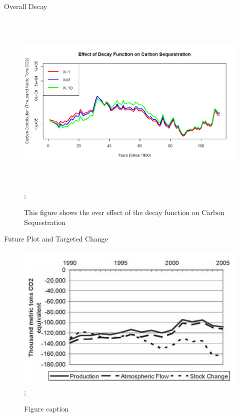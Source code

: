 \documentclass[final]{beamer}\usepackage[]{graphicx}\usepackage[]{color}
\newlength{\onecolwid}
\begin{document}
\begin{frame}[t]
\begin{columns}[t]
\begin{column}{\onecolwid}
\begin{block}{Overall Decay}
\begin{center}
\begin{figure}
    {\includegraphics[width=1\linewidth, height=9cm]{overalldecay.png}};
    \caption{This figure shows the over effect of the decay function on Carbon Sequestration}
\end{figure}
\end{center}

\end{block}

\begin{block}{Future Plot and Targeted Change}
\begin{center}

\begin{figure}
    {\includegraphics[width=1\linewidth]{graph1.png}};
    \caption{Figure caption}
\end{figure}
\end{center}


\end{block}
\end{column}
\end{columns}
\end{frame}
\end{document}
